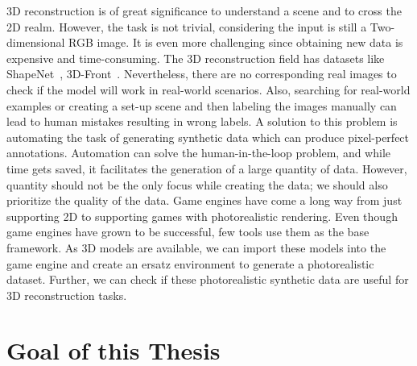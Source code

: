 3D reconstruction is of great significance to understand a scene and to cross the 2D realm.
However, the task is not trivial, considering the input is still a Two-dimensional RGB image.
It is even more challenging since obtaining new data is expensive and time-consuming.
The 3D reconstruction field has datasets like ShapeNet~\cite{shapenet2015}, 3D-Front~\cite{Fu20203DFRONT3F}.
Nevertheless, there are no corresponding real images to check if the model will work in real-world scenarios.
Also, searching for real-world examples or creating a set-up scene and then labeling the images manually can lead to human mistakes resulting in wrong labels.
A solution to this problem is automating the task of generating synthetic data which can produce pixel-perfect annotations.
Automation can solve the human-in-the-loop problem, and while time gets saved, it facilitates the generation of a large quantity of data.
However, quantity should not be the only focus while creating the data;
we should also prioritize the quality of the data.
Game engines have come a long way from just supporting 2D to supporting games with photorealistic rendering.
Even though game engines have grown to be successful, few tools use them as the base framework.
As 3D models are available, we can import these models into the game engine and create an ersatz environment to generate a photorealistic dataset.
Further, we can check if these photorealistic synthetic data are useful for 3D reconstruction tasks.

\section{Goal of this Thesis}\label{sec:goal}

